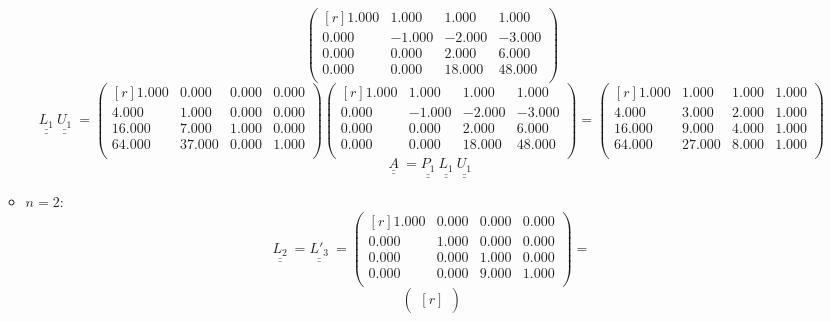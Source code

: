 \documentclass{report}[10pts]
\begin{document}
\begin{enumerate}[- Ex. 1]
\begin{itemize}
\[\begin{pmatrix*}[r]
         1.000 & 1.000 & 1.000 & 1.000\\
         0.000 & -1.000 & -2.000 & -3.000\\
         0.000 & 0.000 & 2.000 & 6.000\\
         0.000 & 0.000 & 18.000 & 48.000\\
      \end{pmatrix*}
\]
\[
   \underline{\underline{L_{1}}}~
   \underline{\underline{U_{1}}}~
   =
      \begin{pmatrix*}[r]
         1.000 & 0.000 & 0.000 & 0.000\\
         4.000 & 1.000 & 0.000 & 0.000\\
         16.000 & 7.000 & 1.000 & 0.000\\
         64.000 & 37.000 & 0.000 & 1.000\\
      \end{pmatrix*}
      \begin{pmatrix*}[r]
         1.000 & 1.000 & 1.000 & 1.000\\
         0.000 & -1.000 & -2.000 & -3.000\\
         0.000 & 0.000 & 2.000 & 6.000\\
         0.000 & 0.000 & 18.000 & 48.000\\
      \end{pmatrix*}
   =
      \begin{pmatrix*}[r]
         1.000 & 1.000 & 1.000 & 1.000\\
         4.000 & 3.000 & 2.000 & 1.000\\
         16.000 & 9.000 & 4.000 & 1.000\\
         64.000 & 27.000 & 8.000 & 1.000\\
      \end{pmatrix*}
\]
\[
   \underline{\underline{A}}~
   =
   \underline{\underline{P_{1}}}~
   \underline{\underline{L_{1}}}~
   \underline{\underline{U_{1}}}~
\]
\item $n=2$:
\[
   \underline{\underline{L_{2}}}~
   =
   \underline{\underline{L'_{3}}}~
   =
      \begin{pmatrix}[r]
         1.000 & 0.000 & 0.000 & 0.000\\
         0.000 & 1.000 & 0.000 & 0.000\\
         0.000 & 0.000 & 1.000 & 0.000\\
         0.000 & 0.000 & 9.000 & 1.000\\
      \end{pmatrix}
   =
\]
\[
      \begin{pmatrix*}[r]

\end{pmatrix*}\]
\end{itemize}
\end{enumerate}
\end{document}
